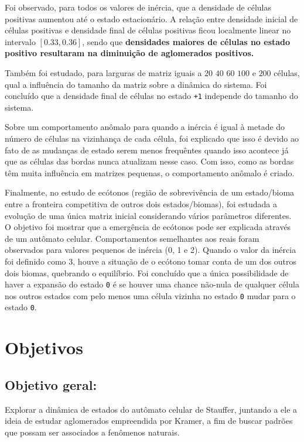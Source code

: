 \documentclass[
	12pt,				%
	openright,			%
	twoside,			%
	a4paper,			%
	english,			%
	french,				%
	spanish,			%
	brazil				%
	]{abntex2}
\begin{document}
Foi observado, para todos os valores de inércia, que a densidade de células positivas aumentou até o estado estacionário. A relação entre densidade inicial de células positivas e densidade final de células positivas ficou localmente linear no intervalo $[0.33, 0.36]$, sendo que \textbf{densidades maiores de células no estado positivo resultaram na diminuição de aglomerados positivos.}

Também foi estudado, para larguras de matriz iguais a $20$ $40$ $60$ $100$ e $200$ células, qual a influência do tamanho da matriz sobre a dinâmica do sistema. Foi concluído que a densidade final de células no estado \texttt{+1} independe do tamanho do sistema.

Sobre um comportamento anômalo para quando a inércia é igual à metade do número de células na vizinhança de cada célula, foi explicado que isso é devido ao fato de as mudanças de estado serem menos frequêntes quando isso acontece já que as células das bordas nunca atualizam nesse caso. Com isso, como as bordas têm muita influência em matrizes pequenas, o comportamento anômalo é criado.

Finalmente, no estudo de ecótonos (região de sobrevivência de um estado/bioma entre a fronteira competitiva de outros dois estados/biomas), foi estudada a evolução de uma única matriz inicial considerando vários parâmetros diferentes. O objetivo foi mostrar que a emergência de ecótonos pode ser explicada através de um autômato celular. Comportamentos semelhantes aos reais foram observados para valores pequenos de inércia (0, 1 e 2). Quando o valor da inércia foi definido como $3$, houve a situação de o ecótono tomar conta de um dos outros dois biomas, quebrando o equilíbrio. Foi concluído que a única possibilidade de haver a expansão do estado \texttt{0} é se houver uma chance não-nula de qualquer célula nos outros estados com pelo menos uma célula vizinha no estado \texttt{0} mudar para o estado \texttt{0}.

\section*{Objetivos}


\subsection*{Objetivo geral:}
Explorar a dinâmica de estados do autômato celular de Stauffer, juntando a ele a ideia de estudar aglomerados empreendida por Kramer, a fim de buscar padrões que possam ser associados a fenômenos naturais.
\end{document}
